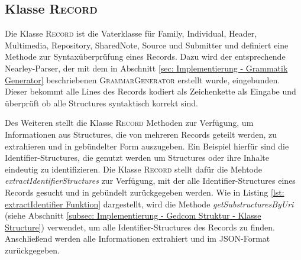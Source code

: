 \subsection{Klasse \textsc{Record}}
\label{subsec: Implementierung - Gedcom Struktur - Klasse Record}
Die Klasse \textsc{Record} ist die Vaterklasse für Family, Individual, Header, Multimedia, Repository, SharedNote, Source und Submitter und definiert eine Methode zur Syntaxüberprüfung eines Records. Dazu wird der entsprechende Nearley-Parser, der mit dem in Abschnitt \ref{sec: Implementierung - Grammatik Generator} beschriebenen \textsc{GrammarGenerator} erstellt wurde, eingebunden. Dieser bekommt alle Lines des Records kodiert als Zeichenkette als Eingabe und überprüft ob alle Structures syntaktisch korrekt sind.


Des Weiteren stellt die Klasse \textsc{Record} Methoden zur Verfügung, um Informationen aus Structures, die von mehreren Records geteilt werden, zu extrahieren und in gebündelter Form auszugeben. Ein Beispiel hierfür sind die Identifier-Structures, die genutzt werden um Structures oder ihre Inhalte eindeutig zu identifizieren. Die Klasse \textsc{Record} stellt dafür die Mehtode \textit{extractIdentifierStructures} zur Verfügung, mit der alle Identifier-Structures eines Records gesucht und in gebündelt zurückgegeben werden. Wie in Listing \ref{lst: extractIdentifier Funktion} dargestellt, wird die Methode \textit{getSubstructuresByUri} (siehe Abschnitt \ref{subsec: Implementierung - Gedcom Struktur - Klasse Structure}) verwendet, um alle Identifier-Structures des Records zu finden. Anschließend werden alle Informationen extrahiert und im JSON-Format zurückgegeben. 
\\ \\
